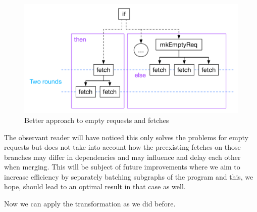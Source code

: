 \begin{figure}
    \includegraphics[width=\linewidth]{../Figures/if-insert-empty-better-after-insert}
    \caption{Better approach to empty requests and fetches}
    \label{if-insert-empty-better-after-insert}
\end{figure}

The observant reader will have noticed this only solves the problems for empty requests but does not take into account how the preexisting fetches on those branches may differ in dependencies and may influence and delay each other when merging.
This will be subject of future improvements where we aim to increase efficiency by separately batching subgraphs of the program and this, we hope, should lead to an optimal result in that case as well.

Now we can apply the transformation as we did before.
